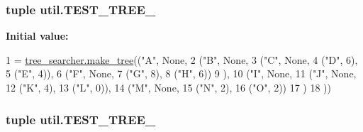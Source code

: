 \subsubsection[{T\+E\+S\+T\+\_\+\+T\+R\+E\+E\+\_\+2}]{\setlength{\rightskip}{0pt plus 5cm}tuple util.\+T\+E\+S\+T\+\_\+\+T\+R\+E\+E\+\_}\label{namespaceutil_a9ae6aec6e35dfd821e0ffaac044a1990}
{\bfseries Initial value\+:}
\begin{DoxyCode}
1 = \hyperlink{namespacetree__searcher_ad7aa3b2a8e8a2967ca966399c95c9401}{tree\_searcher.make\_tree}((\textcolor{stringliteral}{"A"}, \textcolor{keywordtype}{None},
2                                        (\textcolor{stringliteral}{"B"}, \textcolor{keywordtype}{None},
3                                         (\textcolor{stringliteral}{"C"}, \textcolor{keywordtype}{None},
4                                          (\textcolor{stringliteral}{"D"}, 6),
5                                          (\textcolor{stringliteral}{"E"}, 4)),
6                                         (\textcolor{stringliteral}{"F"}, \textcolor{keywordtype}{None},
7                                          (\textcolor{stringliteral}{"G"}, 8),
8                                          (\textcolor{stringliteral}{"H"}, 6))
9                                         ),
10                                        (\textcolor{stringliteral}{"I"}, \textcolor{keywordtype}{None},
11                                         (\textcolor{stringliteral}{"J"}, \textcolor{keywordtype}{None},
12                                          (\textcolor{stringliteral}{"K"}, 4),
13                                          (\textcolor{stringliteral}{"L"}, 0)),
14                                         (\textcolor{stringliteral}{"M"}, \textcolor{keywordtype}{None},
15                                          (\textcolor{stringliteral}{"N"}, 2),
16                                          (\textcolor{stringliteral}{"O"}, 2))
17                                         )
18                                        ))
\end{DoxyCode}
\hypertarget{namespaceutil_a66be78f83e41a72ba109897c87dd8c37}{}
\subsubsection[{T\+E\+S\+T\+\_\+\+T\+R\+E\+E\+\_\+3}]{\setlength{\rightskip}{0pt plus 5cm}tuple util.\+T\+E\+S\+T\+\_\+\+T\+R\+E\+E\+\_}\label{namespaceutil_a66be78f83e41a72ba109897c87dd8c37}
\hypertarget{namespaceutil_ad0bc1a0f6b9b7b0f55adf4b9120ba14d}{}
